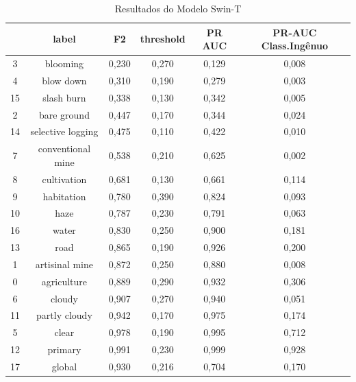 \begin{table}[h!]
    \caption{Resultados do Modelo Swin-T}
    \centering
\begin{tabular}{*{6}{c}}
    \toprule
    {} &              label &  F2    &  threshold &  PR AUC &  PR-AUC Class.Ingênuo \\
    \midrule
    3  &           blooming &  0,230 &      0,270 &   0,129 &       0,008 \\
    4  &          blow down &  0,310 &      0,190 &   0,279 &       0,003 \\
    15 &         slash burn &  0,338 &      0,130 &   0,342 &       0,005 \\
    2  &        bare ground &  0,447 &      0,170 &   0,344 &       0,024 \\
    14 &  selective logging &  0,475 &      0,110 &   0,422 &       0,010 \\
    7  &  conventional mine &  0,538 &      0,210 &   0,625 &       0,002 \\
    8  &        cultivation &  0,681 &      0,130 &   0,661 &       0,114 \\
    9  &         habitation &  0,780 &      0,390 &   0,824 &       0,093 \\
    10 &               haze &  0,787 &      0,230 &   0,791 &       0,063 \\
    16 &              water &  0,830 &      0,250 &   0,900 &       0,181 \\
    13 &               road &  0,865 &      0,190 &   0,926 &       0,200 \\
    1  &     artisinal mine &  0,872 &      0,250 &   0,880 &       0,008 \\
    0  &        agriculture &  0,889 &      0,290 &   0,932 &       0,306 \\
    6  &             cloudy &  0,907 &      0,270 &   0,940 &       0,051 \\
    11 &      partly cloudy &  0,942 &      0,170 &   0,975 &       0,174 \\
    5  &              clear &  0,978 &      0,190 &   0,995 &       0,712 \\
    12 &            primary &  0,991 &      0,230 &   0,999 &       0,928 \\
    17 &             global &  0,930 &      0,216 &   0,704 &       0,170 \\
    \bottomrule
\end{tabular}
\label{table:AnexosResultadosSwinT}
\end{table}



